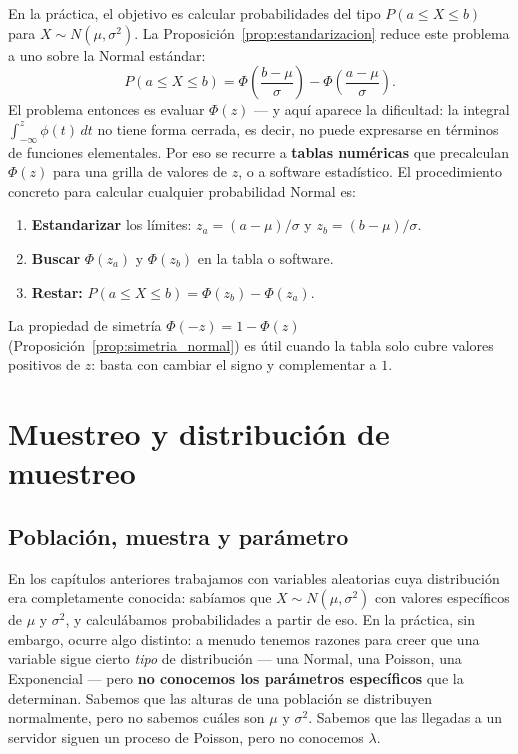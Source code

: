 \documentclass[12pt, a4paper]{book}
\numberwithin{equation}{chapter}
\begin{document}
En la práctica, el objetivo es calcular probabilidades del tipo
$P(a \leq X \leq b)$ para $X \sim N(\mu, \sigma^2)$. La
Proposici\'{o}n~\ref{prop:estandarizacion} reduce este problema
a uno sobre la Normal est\'{a}ndar:
\[
P(a \leq X \leq b)
= \Phi\!\left(\frac{b-\mu}{\sigma}\right)
- \Phi\!\left(\frac{a-\mu}{\sigma}\right).
\]
El problema entonces es evaluar $\Phi(z)$ --- y aquí aparece
la dificultad: la integral $\int_{-\infty}^z \phi(t)\,dt$ no
tiene forma cerrada, es decir, no puede expresarse en términos
de funciones elementales. Por eso se recurre a
\textbf{tablas numéricas} que precalculan $\Phi(z)$ para una
grilla de valores de $z$, o a software estadístico. El
procedimiento concreto para calcular cualquier probabilidad
Normal es:
\begin{enumerate}[label=\textbf{\arabic*.}]
	\item \textbf{Estandarizar} los límites: $z_a = (a-\mu)/\sigma$
	y $z_b = (b-\mu)/\sigma$.
	\item \textbf{Buscar} $\Phi(z_a)$ y $\Phi(z_b)$ en la tabla
	o software.
	\item \textbf{Restar:} $P(a \leq X \leq b) =
	\Phi(z_b) - \Phi(z_a)$.
\end{enumerate}
La propiedad de simetría $\Phi(-z) = 1 - \Phi(z)$
(Proposici\'{o}n~\ref{prop:simetria_normal}) es útil cuando
la tabla solo cubre valores positivos de $z$: basta con cambiar
el signo y complementar a $1$.

\chapter{Muestreo y distribuci\'{o}n de muestreo}

\section{Poblaci\'{o}n, muestra y par\'{a}metro}

En los capítulos anteriores trabajamos con variables aleatorias
cuya distribución era completamente conocida: sabíamos que
$X \sim N(\mu, \sigma^2)$ con valores específicos de $\mu$ y
$\sigma^2$, y calculábamos probabilidades a partir de eso. En
la práctica, sin embargo, ocurre algo distinto: a menudo
tenemos razones para creer que una variable sigue cierto
\emph{tipo} de distribución --- una Normal, una Poisson, una
Exponencial --- pero \textbf{no conocemos los parámetros
	específicos} que la determinan. Sabemos que las alturas de una
población se distribuyen normalmente, pero no sabemos cuáles son
$\mu$ y $\sigma^2$. Sabemos que las llegadas a un servidor
siguen un proceso de Poisson, pero no conocemos $\lambda$.
\end{document}
